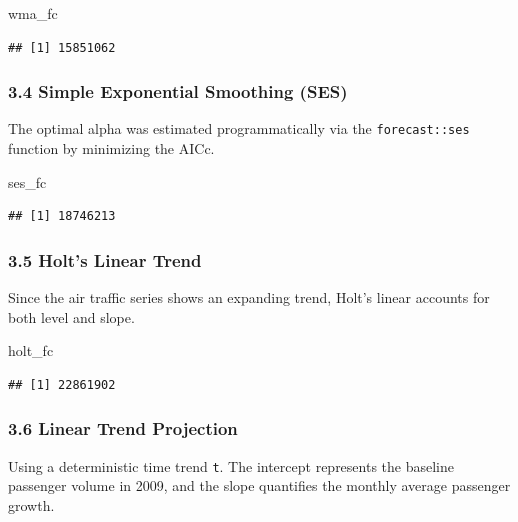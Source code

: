 \documentclass[
]{article}
\newenvironment{Shaded}{\begin{snugshade}}{\end{snugshade}}
\newcommand{\NormalTok}[1]{#1}
\begin{document}
\begin{Shaded}
\begin{Highlighting}[]
\NormalTok{wma\_fc}
\end{Highlighting}
\end{Shaded}

\begin{verbatim}
## [1] 15851062
\end{verbatim}

\subsubsection{3.4 Simple Exponential Smoothing
(SES)}\label{simple-exponential-smoothing-ses}

The optimal alpha was estimated programmatically via the
\texttt{forecast::ses} function by minimizing the AICc.

\begin{Shaded}
\begin{Highlighting}[]
\NormalTok{ses\_fc}
\end{Highlighting}
\end{Shaded}

\begin{verbatim}
## [1] 18746213
\end{verbatim}

\subsubsection{3.5 Holt's Linear Trend}\label{holts-linear-trend}

Since the air traffic series shows an expanding trend, Holt's linear
accounts for both level and slope.

\begin{Shaded}
\begin{Highlighting}[]
\NormalTok{holt\_fc}
\end{Highlighting}
\end{Shaded}

\begin{verbatim}
## [1] 22861902
\end{verbatim}

\subsubsection{3.6 Linear Trend
Projection}\label{linear-trend-projection}

Using a deterministic time trend \texttt{t}. The intercept represents
the baseline passenger volume in 2009, and the slope quantifies the
monthly average passenger growth.
\end{document}
